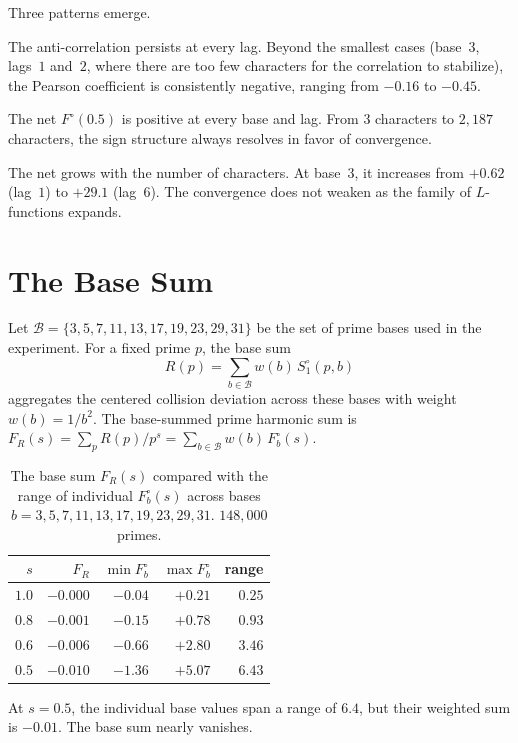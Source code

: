 \documentclass[12pt]{amsart}
\theoremstyle{definition}
\theoremstyle{remark}
\begin{document}
Three patterns emerge.

The anti-correlation persists at every lag. Beyond the
smallest cases (base~$3$, lags~$1$ and~$2$, where
there are too few characters for the correlation to
stabilize), the Pearson coefficient is consistently
negative, ranging from $-0.16$ to $-0.45$.

The net $F^{\circ}(0.5)$ is positive at every base and
lag. From $3$ characters to $2{,}187$ characters, the
sign structure always resolves in favor of convergence.

The net grows with the number of characters. At base~$3$,
it increases from $+0.62$ (lag~$1$) to $+29.1$
(lag~$6$). The convergence does not weaken as the
family of $L$-functions expands.

\section{The Base Sum}

Let $\mathcal{B} = \{3,5,7,11,13,17,19,23,29,31\}$
be the set of prime bases used in the experiment.
For a fixed prime $p$, the base sum
\[
R(p) = \sum_{b \in \mathcal{B}} w(b)\, S^{\circ}_1(p, b)
\]
aggregates the centered collision deviation across
these bases with weight $w(b) = 1/b^2$. The
base-summed prime harmonic sum is
$F_R(s) = \sum_p R(p) / p^s = \sum_{b \in \mathcal{B}}
w(b)\, F^{\circ}_b(s)$.

\begin{table}[h]
\centering
\begin{tabular}{rrrrr}
\toprule
$s$ & $F_R$ & $\min F^{\circ}_b$ &
$\max F^{\circ}_b$ & range \\
\midrule
$1.0$ & $-0.000$ & $-0.04$ & $+0.21$ & $0.25$ \\
$0.8$ & $-0.001$ & $-0.15$ & $+0.78$ & $0.93$ \\
$0.6$ & $-0.006$ & $-0.66$ & $+2.80$ & $3.46$ \\
$0.5$ & $-0.010$ & $-1.36$ & $+5.07$ & $6.43$ \\
\bottomrule
\end{tabular}
\caption{The base sum $F_R(s)$ compared with the range
of individual $F^{\circ}_b(s)$ across bases
$b = 3, 5, 7, 11, 13, 17, 19, 23, 29, 31$.
$148{,}000$ primes.}
\label{tab:basesum}
\end{table}

At $s = 0.5$, the individual base values span a range
of $6.4$, but their weighted sum is $-0.01$. The
base sum nearly vanishes.
\end{document}
